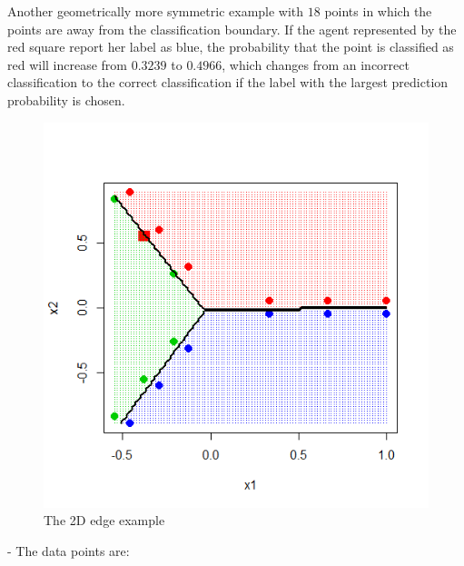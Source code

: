\documentclass{article}
\begin{document}
Another geometrically more symmetric example with $18$ points in which the points are away from the classification boundary. If the agent represented by the red square report her label as blue, the probability that the point is classified as red will increase from $0.3239$ to $0.4966$, which changes from an incorrect classification to the correct classification if the label with the largest prediction probability is chosen.
\begin{figure}[H]
\centering
\includegraphics[width=0.5\linewidth]{test_18_5}
\caption{The 2D edge example}
\end{figure}
 -
\newline \newline
The data points are:
\end{document}
